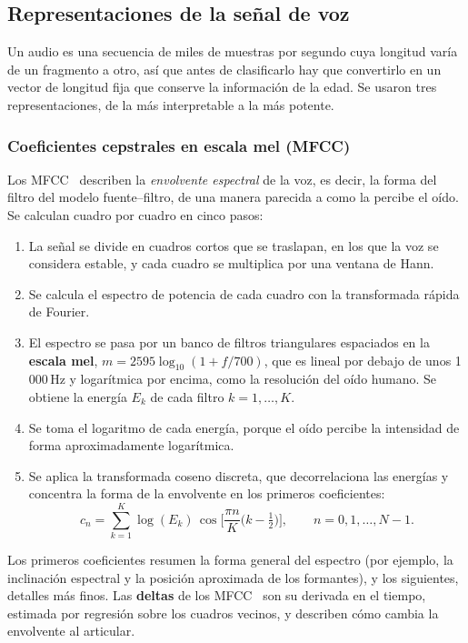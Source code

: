 \documentclass[11pt,a4paper]{article}
\begin{document}
\subsection{Representaciones de la señal de voz}

Un audio es una secuencia de miles de muestras por segundo cuya longitud varía de un fragmento a otro, así que antes de clasificarlo hay que convertirlo en un vector de longitud fija que conserve la información de la edad. Se usaron tres representaciones, de la más interpretable a la más potente.

\subsubsection{Coeficientes cepstrales en escala mel (MFCC)}
\label{sec:mfcc}

Los MFCC~\cite{davis1980} describen la \emph{envolvente espectral} de la voz, es decir, la forma del filtro del modelo fuente--filtro, de una manera parecida a como la percibe el oído. Se calculan cuadro por cuadro en cinco pasos:
\begin{enumerate}
  \item La señal se divide en cuadros cortos que se traslapan, en los que la voz se considera estable, y cada cuadro se multiplica por una ventana de Hann.
  \item Se calcula el espectro de potencia de cada cuadro con la transformada rápida de Fourier.
  \item El espectro se pasa por un banco de filtros triangulares espaciados en la \textbf{escala mel}, $m = 2595 \log_{10}(1 + f/700)$, que es lineal por debajo de unos 1\,000\,Hz y logarítmica por encima, como la resolución del oído humano. Se obtiene la energía $E_k$ de cada filtro $k = 1, \dots, K$.
  \item Se toma el logaritmo de cada energía, porque el oído percibe la intensidad de forma aproximadamente logarítmica.
  \item Se aplica la transformada coseno discreta, que decorrelaciona las energías y concentra la forma de la envolvente en los primeros coeficientes:
  \begin{equation}
    c_n = \sum_{k=1}^{K} \log(E_k)\,\cos\!\Big[\frac{\pi n}{K}\Big(k - \tfrac{1}{2}\Big)\Big], \qquad n = 0, 1, \dots, N-1.
  \end{equation}
\end{enumerate}
Los primeros coeficientes resumen la forma general del espectro (por ejemplo, la inclinación espectral y la posición aproximada de los formantes), y los siguientes, detalles más finos. Las \textbf{deltas} de los MFCC~\cite{furui1986} son su derivada en el tiempo, estimada por regresión sobre los cuadros vecinos, y describen cómo cambia la envolvente al articular.
\end{document}
